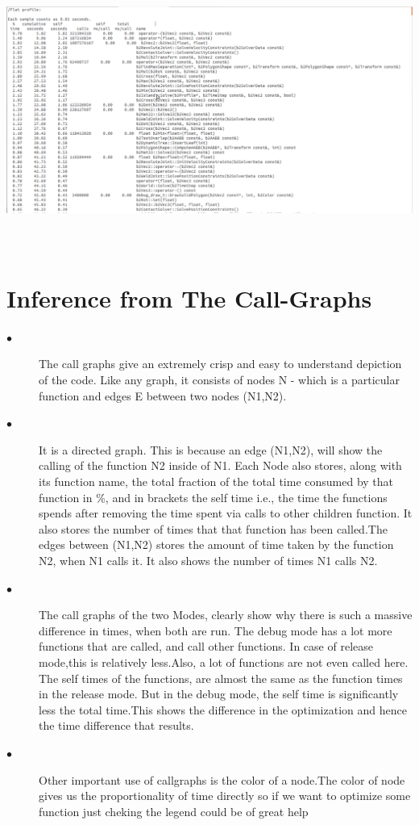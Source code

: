 \documentclass[11pt]{article}
\begin{document}
\includegraphics[height=9cm]{./images/release_dat1.png}


\section*{Inference from The Call-Graphs}
\begin{description}
\item[$\bullet$ ]
The call graphs give an extremely crisp and easy to understand depiction of the code. Like any graph, it consists of nodes N - which is a particular function and edges E between two nodes (N1,N2). 
\newline
\item[$\bullet$ ]
It is a directed graph. This is because an edge (N1,N2), will show the calling of the function N2 inside of N1. Each Node also stores, along with its function name, the total fraction of the total time consumed by that function in \%, and in brackets the self time i.e., the time the functions spends after removing the time spent via calls to other children function. It also stores the number of times that that function has been called.The edges between (N1,N2) stores the amount of time taken by the function N2, when N1 calls it. It also shows the number of times N1 calls N2.\newline
\item[$\bullet$ ]
The call graphs of the two Modes, clearly show why there is such a massive difference in times, when both are run. The debug mode has a lot more functions that are called, and call other functions. In case of release mode,this is relatively less.Also, a lot of functions are not even called here. The self times of the functions, are almost the same as the function times in the release mode. But in the debug mode, the self time is significantly less the total time.This shows the difference in the optimization and hence the time difference that results.
\newline
\item[$\bullet$ ]
Other important use of callgraphs is the color of a node.The color of node gives us the proportionality of time directly so if we want to optimize some function just cheking the legend could be of great help
\end{description}
\end{document}
